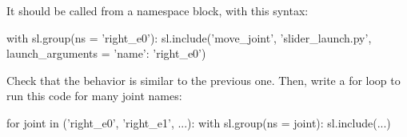 \documentclass{ecnreport}
\begin{document}
It should be called from a namespace block, with this syntax:
\begin{pythoncodelarge}
with sl.group(ns = 'right_e0'):
  sl.include('move_joint', 'slider_launch.py', launch_arguments = {'name': 'right_e0'})
\end{pythoncodelarge}

Check that the behavior is similar to the previous one. Then, write a for loop to run this code for many joint names:
\begin{pythoncodelarge}
for joint in ('right_e0', 'right_e1', ...):
    with sl.group(ns = joint):
        sl.include(...)
\end{pythoncodelarge}
\end{document}

